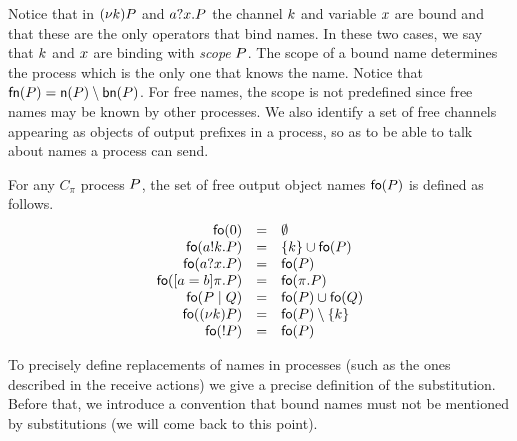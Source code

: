 Notice that in $(\nu k) P$ and $a?x.P$ the channel 
$k$ and variable $x$ are bound and that these are the only operators that bind names. 
In these two cases, we say that $k$ and $x$ are binding 
with \emph{scope} $P$. 
The scope of a bound name determines the process which is the only one that knows the name.
Notice that $\mathsf{fn}(P)=\mathsf{n}(P)\setminus\mathsf{bn}(P)$. 
For free names, the scope is not predefined since free names may be known by other processes.
We also identify a set of free channels appearing as objects of output prefixes in a process, so as to be able to talk about names a process can send.
%
\begin{definition}\label{def:Cpi_fo}
For any $C_\pi$ process $P$, the set of free output object names $\mathsf{fo}(P)$ is defined as follows.
\[
\begin{array}{rcl}
\mathsf{fo}(0) & = & \emptyset\\
\mathsf{fo}(a!k.P) & = & \{k\} \cup \mathsf{fo}(P)\\
\mathsf{fo}(a?x.P) & = &  \mathsf{fo}(P)\\
\mathsf{fo}([ a = b ]\pi.P) & = &  \mathsf{fo}(\pi.P)\\
\mathsf{fo}(P \;|\;Q) & = & \mathsf{fo}(P) \cup \mathsf{fo}(Q)\\
\mathsf{fo}((\nu k)P) & = & \mathsf{fo}(P)\setminus\{k\}\\
\mathsf{fo}(! P) & = & \mathsf{fo}(P)
\end{array}
\]
\end{definition}


To precisely define replacements of names in processes (such as the ones described in the receive actions) we give a precise definition of the substitution.  Before that, we introduce a convention that bound names must not be mentioned by substitutions (we will come back to this point).

